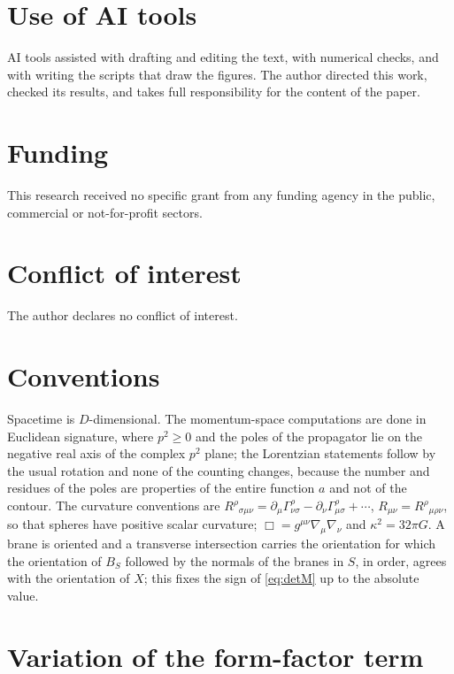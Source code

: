 \documentclass[aps,prd,10pt,twocolumn,superscriptaddress,nofootinbib,floatfix,longbibliography,showpacs,showkeys]{revtex4-2}
\theoremstyle{plain}
\theoremstyle{definition}
\theoremstyle{remark}
\begin{document}
\section*{Use of AI tools}

AI tools assisted with drafting and editing the text, with numerical checks, and with writing the scripts that draw the figures. The author directed this work, checked its results, and takes full responsibility for the content of the paper.

\section*{Funding}

This research received no specific grant from any funding agency in the public, commercial or not-for-profit sectors.

\section*{Conflict of interest}

The author declares no conflict of interest.


\appendix

\section{Conventions}
\label{app:conventions}

Spacetime is $D$-dimensional. The momentum-space computations are done in Euclidean signature, where $p^2\ge0$ and the poles of the propagator lie on the negative real axis of the complex $p^2$ plane; the Lorentzian statements follow by the usual rotation and none of the counting changes, because the number and residues of the poles are properties of the entire function $a$ and not of the contour. The curvature conventions are $R^\rho{}_{\sigma\mu\nu}=\partial_\mu\Gamma^\rho_{\nu\sigma}-\partial_\nu\Gamma^\rho_{\mu\sigma}+\cdots$, $R_{\mu\nu}=R^\rho{}_{\mu\rho\nu}$, so that spheres have positive scalar curvature; $\Box=g^{\mu\nu}\nabla_\mu\nabla_\nu$ and $\kappa^2=32\pi G$. A brane is oriented and a transverse intersection carries the orientation for which the orientation of $B_S$ followed by the normals of the branes in $S$, in order, agrees with the orientation of $X$; this fixes the sign of \eqref{eq:detM} up to the absolute value.

\section{Variation of the form-factor term}
\label{app:stress}
\end{document}
